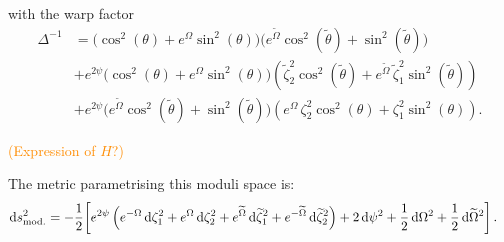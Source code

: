 \documentclass[a4paper, 11pt]{article}
\numberwithin{equation}{section}
\newcommand{\ts}[1]{\widetilde{#1}}
\newcommand{\+}{\oplus}
\renewcommand{\d}{\ensuremath{\mathrm{d}}\xspace}
\newcommand{\CE}[1]{\textcolor{darkorange}{#1}}
\begin{document}
with the warp factor
\begin{equation}
	\begin{aligned}
	\Delta^{-1} &= \Big(\cos^{2}(\theta)+e^{\Omega}\sin^{2}(\theta)\Big)\Big(e^{\ts{\Omega}}\cos^{2}(\ts{\theta})+\sin^{2}(\ts{\theta})\Big)\\
	&+e^{2\psi}\Big(\cos^{2}(\theta)+e^{\Omega}\sin^{2}(\theta)\Big)\left(\ts{\zeta}_{2}^{2}\cos^{2}(\ts{\theta})+e^{\ts{\Omega}}\,\ts{\zeta}_{1}^{2}\sin^{2}(\ts{\theta})\right)\\
	&+e^{2\psi}\Big(e^{\ts{\Omega}}\cos^{2}(\ts{\theta})+\sin^{2}(\ts{\theta})\Big)\left(e^{\Omega}\,\zeta_{2}^{2}\cos^{2}(\theta)+\zeta_{1}^{2}\sin^{2}(\theta)\right).
	\end{aligned}
\end{equation}

\CE{(Expression of $H$?)}

The metric parametrising this moduli space is:
\begin{equation}
	\begin{aligned}
		\d s^{2}_{\rm mod.} &= -\frac{1}{2}\bigg[e^{2\psi}\left(e^{-\Omega}\,\d\zeta_{1}^{2}+e^{\Omega}\,\d\zeta_{2}^{2}+e^{\ts{\Omega}}\,\d\ts{\zeta}_{1}^{2}+e^{-\ts{\Omega}}\,\d\ts{\zeta}_{2}^{2}\right) +2\,\d\psi^{2} + \frac{1}{2}\,\d\Omega^{2}+ \frac{1}{2}\,\d\ts{\Omega}^{2}\bigg]\,.
	\end{aligned}
\end{equation}
\end{document}
